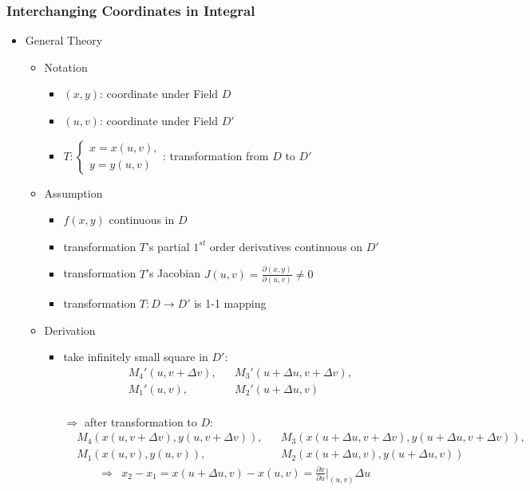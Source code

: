 \subsubsection{Interchanging Coordinates in Integral}
\begin{itemize}
\item General Theory
	\begin{itemize}
	\item Notation
		\begin{itemize}
		\item $(x,y)$: coordinate under Field $D$
		\item $(u,v)$: coordinate under Field $D'$
		\item $\displaystyle T: \begin{cases} x=x(u,v), \\ y=y(u,v) \end{cases}$: transformation from $D$ to $D'$
		\end{itemize} 
	\item Assumption
		\begin{itemize}
		\item $f(x,y)$ continuous in $D$
		\item transformation $T$'s partial $1^{st}$ order derivatives continuous on $D'$
		\item transformation $T$'s Jacobian $J(u,v) = \frac {\partial (x,y)}{\partial (u,v)} \neq 0$
		\item transformation $T: D\rightarrow D'$ is 1-1 mapping
		\end{itemize}
	\item Derivation
		\begin{itemize}
		\item take infinitely small square in $D':$
		\begin{align*} &M_4'(u,v+\Delta v),&&M_3'(u+\Delta u, v+\Delta v),\\&M_1'(u, v),&&M_2'(u+\Delta u, v) \end{align*} \\
		$\Rightarrow$ after transformation to $D:$ 
		\begin{align*} 
		&M_4(x(u,v+\Delta v),y(u,v+\Delta v)),&&M_3(x(u+\Delta u, v+\Delta v),y(u+\Delta u, v+\Delta v)),\\&M_1(x(u, v),y(u, v)),&&M_2(x(u+\Delta u, v),y(u+\Delta u, v)) 
		\end{align*}
		\begin{align*} 
		\Rightarrow &x_2 - x_1 = x(u+\Delta u, v) - x(u,v) = \frac {\partial x}{\partial u}\rvert_{(u,v)} \Delta u \\

\end{align*}
\end{itemize}
\end{itemize}
\end{itemize}
